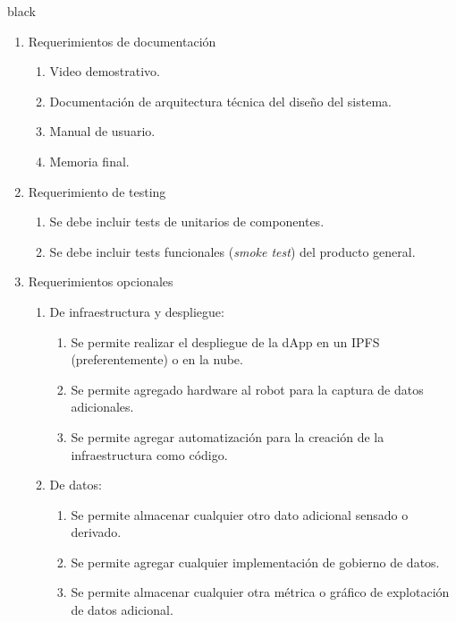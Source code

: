 \documentclass[
11pt, %
]{charter}
\begin{document}
\begin{consigna}{black}
\begin{enumerate}
	\item Requerimientos de documentación		
		\begin{enumerate}			
			\item Video demostrativo.	
			\item Documentación de arquitectura técnica del diseño del sistema.			
			\item Manual de usuario.	
			\item Memoria final.	
		\end{enumerate}	
		
	\item Requerimiento de testing		
		\begin{enumerate}			
			\item Se debe incluir tests de unitarios de componentes.
			\item Se debe incluir tests funcionales (\textit{smoke test}) del producto general.		
		\end{enumerate}	
	
	\item Requerimientos opcionales		
		\begin{enumerate}			
			\item De infraestructura y despliegue:
				\begin{enumerate}			
					\item Se permite realizar el despliegue de la dApp en un IPFS (preferentemente) o en la nube.					
					\item Se permite agregado hardware al robot para la captura de datos adicionales.
					\item Se permite agregar automatización para la creación de la infraestructura como código.
				\end{enumerate}			
			
			\item De datos:
				\begin{enumerate}			
					\item Se permite almacenar cualquier otro dato adicional sensado o derivado.
					\item Se permite agregar cualquier implementación de gobierno de datos.	
					\item Se permite almacenar cualquier otra métrica o gráfico de explotación de datos adicional.
				\end{enumerate}
		
	\end{enumerate}
\end{enumerate}
\end{consigna}
\end{document}
